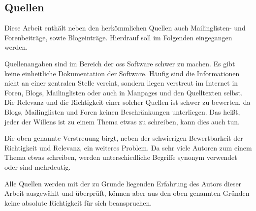 \subsection{Quellen}
Diese Arbeit enthält neben den herkömmlichen Quellen auch Mailinglisten- und Forenbeiträge, sowie Blogeinträge. Hierdrauf soll im Folgenden eingegangen werden.

Quellenangaben sind im Bereich der \gls{oss} Software schwer zu machen. Es gibt keine einheitliche Dokumentation der Software. Häufig sind die Informationen nicht an einer zentralen Stelle vereint, sondern liegen verstreut im Internet in Foren, Blogs, Mailinglisten oder auch in Manpages und den Quelltexten selbst. Die Relevanz und die Richtigkeit einer solcher Quellen ist schwer zu bewerten, da Blogs, Mailinglisten und Foren keinen Beschränkungen unterliegen. Das heißt, jeder der Willens ist zu einem Thema etwas zu schreiben, kann dies auch tun.

Die oben genannte Verstreuung birgt, neben der schwierigen Bewertbarkeit der Richtigkeit und Relevanz, ein weiteres Problem. Da sehr viele Autoren zum einem Thema etwas schreiben, werden unterschiedliche Begriffe synonym verwendet oder sind mehrdeutig.

Alle Quellen werden mit der zu Grunde liegenden Erfahrung des Autors dieser Arbeit ausgewählt und überprüft, können aber aus den oben genannten Gründen keine absolute Richtigkeit für sich beanspruchen.
